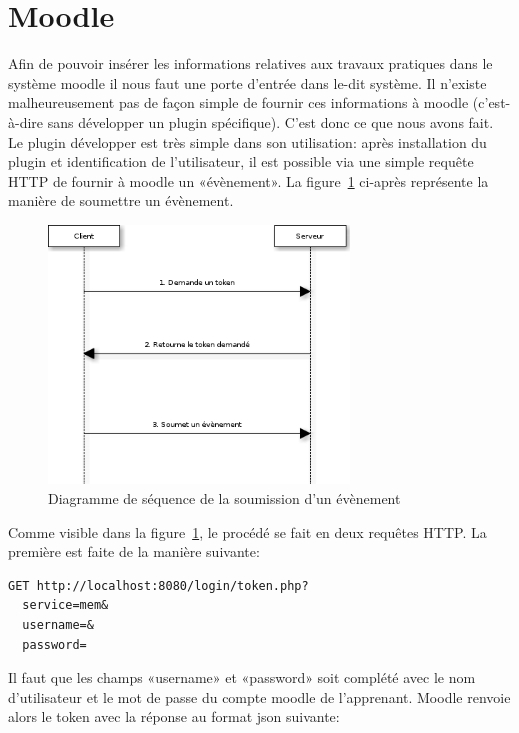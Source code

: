 \documentclass[a4paper,11pt]{report}
\begin{document}
\section{Moodle}

Afin de pouvoir insérer les informations relatives aux travaux pratiques dans le système moodle il nous faut une porte d'entrée dans le-dit système. Il n'existe malheureusement pas de façon simple de fournir ces informations à moodle (c'est-à-dire sans développer un plugin spécifique).
C'est donc ce que nous avons fait. Le plugin développer est très simple dans son utilisation: après installation du plugin et identification de l'utilisateur, il est possible via une simple requête HTTP de fournir à moodle un «évènement». La figure~\ref{seq-submit-event} ci-après représente la manière de soumettre un évènement.

\begin{figure}[h]
  \begin{center}
    \caption{\label{seq-submit-event} Diagramme de séquence de la soumission d'un évènement}
    \includegraphics[width=8cm, keepaspectratio=true]{mem-seq-submit-event.png}
   \end{center}
\end{figure}

Comme visible dans la figure~\ref{seq-submit-event}, le procédé se fait en deux requêtes HTTP. La première est faite de la manière suivante:

\begin{lstlisting}[caption={Requête d'un token}]
GET http://localhost:8080/login/token.php?
  service=mem&
  username=&
  password=
\end{lstlisting}

Il faut que les champs «username» et «password» soit complété avec le nom d'utilisateur et le mot de passe du compte moodle de l'apprenant.
Moodle renvoie alors le token avec la réponse au format json suivante:
\end{document}
